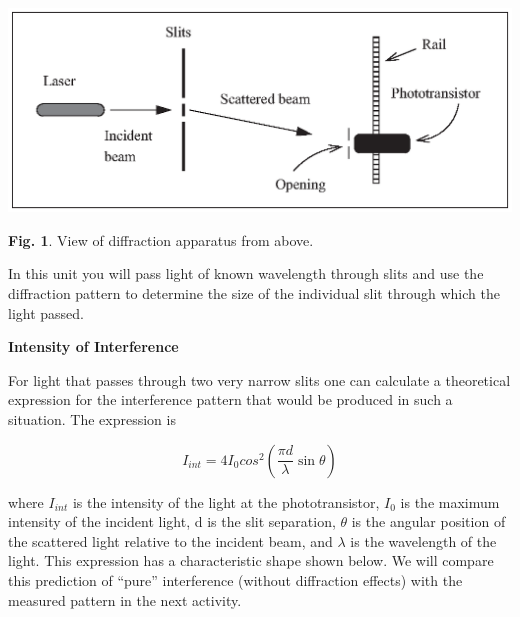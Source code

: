 \vspace{0.3cm}
\begin{center}
\includegraphics{interference_of_light/interference_of_light_fig1b_bw.eps}
\end{center}
\vspace{0.3cm}

{\centering \textbf{Fig. 1}. View of diffraction apparatus from above.\par}

In this unit you will  pass light of known wavelength through slits 
and use the diffraction pattern to determine the size of the individual
slit through which the light passed.

\pagebreak
\textbf{Intensity of Interference }

For light that passes through two very narrow slits one can calculate
a theoretical expression for the interference pattern that would be
produced in such a situation. The expression is 

\begin{displaymath} I_{int} = 4I_0 cos^2 (\frac {\pi d} {\lambda} \sin \theta ) \end{displaymath}

where $I_{int}$ is the intensity of the light at the phototransistor,
$I_{0}$ is the maximum intensity of the incident light, d is
the slit separation, \( \theta  \) is the angular position of the
scattered light relative to the incident beam, and \( \lambda  \)
is the wavelength of the light. This expression has a characteristic
shape shown below. We will compare this prediction of {}``pure''
interference (without diffraction effects) with the measured pattern
in the next activity.

